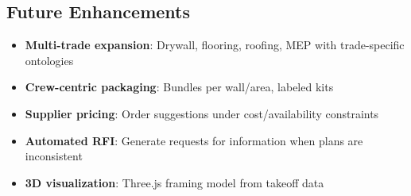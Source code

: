 \subsection{Future Enhancements}

\begin{itemize}
  \item \textbf{Multi-trade expansion}: Drywall, flooring, roofing, MEP with trade-specific ontologies~\cite{pauwels2017kg_ifc}
  \item \textbf{Crew-centric packaging}: Bundles per wall/area, labeled kits
  \item \textbf{Supplier pricing}: Order suggestions under cost/availability constraints
  \item \textbf{Automated RFI}: Generate requests for information when plans are inconsistent~\cite{zhang2015code_nlp}
  \item \textbf{3D visualization}: Three.js framing model from takeoff data
\end{itemize}
